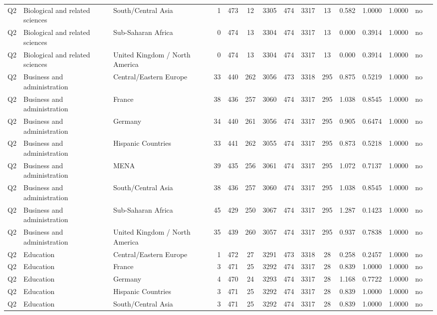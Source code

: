 \begin{longtable}{lllrcccccccccll}
Q2 & Biological and related sciences & South/Central Asia & 1 & 473 & 12 & 3305 & 474 & 3317 & 13 & 0.582 & 1.0000 & 1.0000 & no \\
Q2 & Biological and related sciences & Sub-Saharan Africa & 0 & 474 & 13 & 3304 & 474 & 3317 & 13 & 0.000 & 0.3914 & 1.0000 & no \\
Q2 & Biological and related sciences & United Kingdom / North America & 0 & 474 & 13 & 3304 & 474 & 3317 & 13 & 0.000 & 0.3914 & 1.0000 & no \\
Q2 & Business and administration & Central/Eastern Europe & 33 & 440 & 262 & 3056 & 473 & 3318 & 295 & 0.875 & 0.5219 & 1.0000 & no \\
Q2 & Business and administration & France & 38 & 436 & 257 & 3060 & 474 & 3317 & 295 & 1.038 & 0.8545 & 1.0000 & no \\
Q2 & Business and administration & Germany & 34 & 440 & 261 & 3056 & 474 & 3317 & 295 & 0.905 & 0.6474 & 1.0000 & no \\
Q2 & Business and administration & Hispanic Countries & 33 & 441 & 262 & 3055 & 474 & 3317 & 295 & 0.873 & 0.5218 & 1.0000 & no \\
Q2 & Business and administration & MENA & 39 & 435 & 256 & 3061 & 474 & 3317 & 295 & 1.072 & 0.7137 & 1.0000 & no \\
Q2 & Business and administration & South/Central Asia & 38 & 436 & 257 & 3060 & 474 & 3317 & 295 & 1.038 & 0.8545 & 1.0000 & no \\
Q2 & Business and administration & Sub-Saharan Africa & 45 & 429 & 250 & 3067 & 474 & 3317 & 295 & 1.287 & 0.1423 & 1.0000 & no \\
Q2 & Business and administration & United Kingdom / North America & 35 & 439 & 260 & 3057 & 474 & 3317 & 295 & 0.937 & 0.7838 & 1.0000 & no \\
Q2 & Education & Central/Eastern Europe & 1 & 472 & 27 & 3291 & 473 & 3318 & 28 & 0.258 & 0.2457 & 1.0000 & no \\
Q2 & Education & France & 3 & 471 & 25 & 3292 & 474 & 3317 & 28 & 0.839 & 1.0000 & 1.0000 & no \\
Q2 & Education & Germany & 4 & 470 & 24 & 3293 & 474 & 3317 & 28 & 1.168 & 0.7722 & 1.0000 & no \\
Q2 & Education & Hispanic Countries & 3 & 471 & 25 & 3292 & 474 & 3317 & 28 & 0.839 & 1.0000 & 1.0000 & no \\
Q2 & Education & South/Central Asia & 3 & 471 & 25 & 3292 & 474 & 3317 & 28 & 0.839 & 1.0000 & 1.0000 & no \\

\end{longtable}
